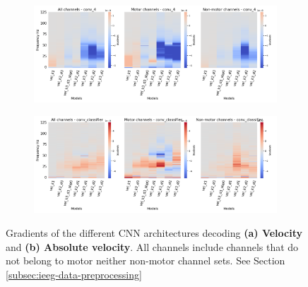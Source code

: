 \begin{figure}[!htpb]
\begin{subfigure}[c]{\textwidth}
   \includegraphics[width=1\linewidth]{img/appendix/A/conv-4/m/vel-model-gradients_all_kinds}
   \caption{}
   \label{fig:vel-full-grad-covn4}
\end{subfigure}

\begin{subfigure}[d]{\textwidth}
   \includegraphics[width=1\linewidth]{img/appendix/A/conv-classifier/m/vel-model-gradients_all_kinds}
   \caption{}
   \label{fig:vel-full-grads-conv-classifier}
\end{subfigure}

\caption[]{Gradients of the different CNN architectures decoding \textbf{(a) Velocity} and \textbf{(b) Absolute velocity}. All channels include channels that do not belong to motor neither non-motor channel sets. See Section \ref{subsec:ieeg-data-preprocessing}}
\label{fig:vel-full-grads}
\end{figure}

